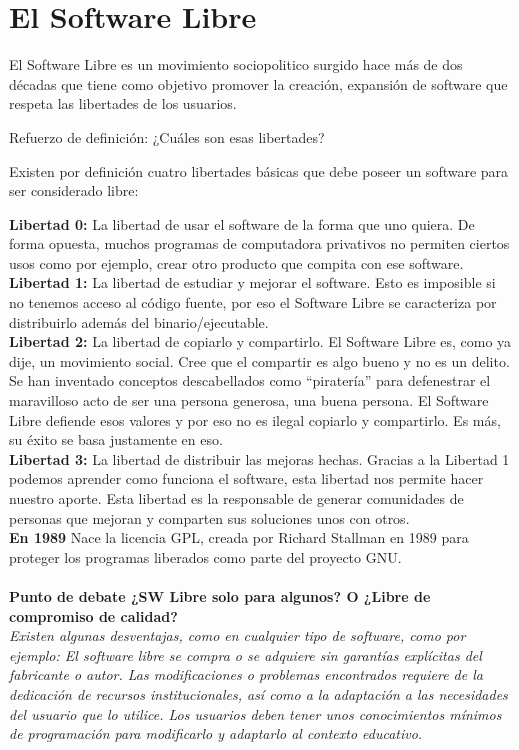 \section{ El Software Libre}

El Software Libre es un movimiento sociopolitico surgido hace más de dos décadas que tiene como objetivo promover la creación, expansión de software que respeta las libertades de los usuarios.

Refuerzo de definición: ¿Cuáles son esas libertades?

Existen por definición cuatro libertades básicas que debe poseer un software para ser considerado libre:

{\bf Libertad 0:}
La libertad de usar el software de la forma que uno quiera. De forma opuesta, muchos programas de computadora privativos no permiten ciertos usos como por ejemplo, crear otro producto que compita con ese software.
\\
{\bf Libertad 1:}
La libertad de estudiar y mejorar el software. Esto es imposible si no tenemos acceso al código fuente, por eso el Software Libre se caracteriza por distribuirlo además del binario/ejecutable.
\\
{\bf Libertad 2:}
La libertad de copiarlo y compartirlo. El Software Libre es, como ya dije, un movimiento social. Cree que el compartir es algo bueno y no es un delito. Se han inventado conceptos descabellados como “piratería” para defenestrar el maravilloso acto de ser una persona generosa, una buena persona. El Software Libre defiende esos valores y por eso no es ilegal copiarlo y compartirlo. Es más, su éxito se basa justamente en eso.
\\
{\bf Libertad 3:}
La libertad de distribuir las mejoras hechas. Gracias a la Libertad 1 podemos aprender como funciona el software, esta libertad nos permite hacer nuestro aporte. Esta libertad es la responsable de generar comunidades de personas que mejoran y comparten sus soluciones unos con otros.
\\
{\bf En 1989} Nace la licencia GPL, creada por Richard Stallman en 1989 para proteger los programas liberados como parte del proyecto GNU.
\\
\\
{\bf Punto de debate ¿SW Libre solo para algunos? O ¿Libre de compromiso de calidad?}
{\it 
\\
Existen algunas desventajas, como en cualquier tipo de software, como por ejemplo:
El software libre se compra o se adquiere sin garantías explícitas del fabricante o autor.
Las modificaciones o problemas encontrados requiere de la dedicación de recursos institucionales, así como a la adaptación a las necesidades del usuario que lo utilice.
Los usuarios deben tener unos conocimientos mínimos de programación para modificarlo y adaptarlo al contexto educativo.
}
